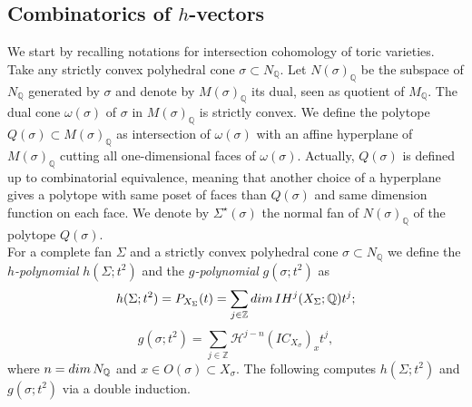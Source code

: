\documentclass[11pt, reqno]{amsart}
\theoremstyle{plain}
\theoremstyle{definition}
\theoremstyle{remark}
\begin{document}
\subsection{Combinatorics of $h$-vectors}
\label{sec: h-poly23}We start by recalling notations for intersection cohomology of toric varieties. 
Take any strictly convex polyhedral cone $\sigma\subset N_{\mathbb{Q}}$. Let $N(\sigma)_{\mathbb{Q}}$ be the subspace of $N_{\mathbb{Q}}$ generated by $\sigma$ and denote
by $M(\sigma)_{\mathbb{Q}}$ its dual, seen as quotient of $M_{\mathbb{Q}}$. The dual cone $\omega(\sigma)$ 
of $\sigma$ in $M(\sigma)_{\mathbb{Q}}$ is strictly convex. We define the polytope $Q(\sigma)\subset  M(\sigma)_{\mathbb{Q}}$ as  intersection of $\omega(\sigma)$ with an affine hyperplane of $M(\sigma)_{\mathbb{Q}}$ cutting all one-dimensional faces of $\omega(\sigma)$. Actually, $Q(\sigma)$ is defined up to combinatorial equivalence, meaning that another choice of a hyperplane  gives a polytope with  same poset of faces than $Q(\sigma)$ and 
 same dimension function on each face. We denote by $\Sigma^{\star}(\sigma)$ the normal fan of $N(\sigma)_{\mathbb{Q}}$
of the polytope $Q(\sigma)$.
\\

For a complete fan $\Sigma$ and a strictly convex polyhedral cone $\sigma\subset N_{\mathbb{Q}}$ we define the \emph{$h$-polynomial} $h(\Sigma; t^{2})$ and the \emph{$g$-polynomial} $g(\sigma; t^{2})$
as 
$$h(\Sigma; t^{2}) =  P_{X_{\Sigma}}(t) =  \sum_{j\in\mathbb{Z}}{\rm dim}\, IH^{j}(X_{\Sigma}; \mathbb{Q})t^{j};$$
$$ g(\sigma; t^{2}) =  \sum_{j\in\mathbb{Z}}\mathcal{H}^{j-n}(IC_{X_{\sigma}})_{x}t^{j},$$
where $n =  {\rm dim}\, N_{\mathbb{Q}}$ and $x\in  O(\sigma) \subset X_{\sigma}$. 
The following computes $h(\Sigma; t^{2})$ and $g(\sigma; t^{2})$ via a double induction. 
\end{document}
